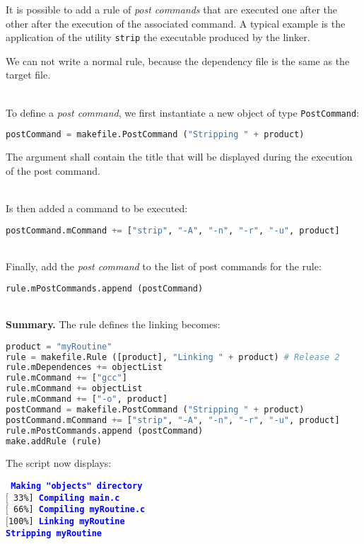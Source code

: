\documentclass[a4paper,11pt]{extarticle}
\begin{document}
It is possible to add a rule of \emph{post commands} that are executed one after the other after the execution of the associated command. A typical example is the application of the utility \texttt{strip} the executable produced by the linker.

We can not write a normal rule, because the dependency file is the same as the target file.

~\\To define a \emph{post command}, we first instantiate a new object of type \texttt{PostCommand}:
\begin{lstlisting}[language=py]
postCommand = makefile.PostCommand ("Stripping " + product)
\end{lstlisting}
The argument shall contain the title that will be displayed during the execution of the post command.

~\\Is then added a command to be executed:
\begin{lstlisting}[language=py]
postCommand.mCommand += ["strip", "-A", "-n", "-r", "-u", product]
\end{lstlisting}

~\\Finally, add the \emph{post command} to the list of post commands for the rule:
\begin{lstlisting}[language=py]
rule.mPostCommands.append (postCommand)
\end{lstlisting}


~\\{\bf Summary.} The rule defines the linking becomes:
\begin{lstlisting}[language=py]
product = "myRoutine"
rule = makefile.Rule ([product], "Linking " + product) # Release 2
rule.mDependences += objectList
rule.mCommand += ["gcc"]
rule.mCommand += objectList
rule.mCommand += ["-o", product]
postCommand = makefile.PostCommand ("Stripping " + product)
postCommand.mCommand += ["strip", "-A", "-n", "-r", "-u", product]
rule.mPostCommands.append (postCommand)
make.addRule (rule)
\end{lstlisting}

The script now displays:

\begin{mdframed}[hidealllines=true,backgroundcolor=lightgray!20]
\tt\footnotesize
\textcolor{blue}{\bf Making "objects" directory}\\
$[$~33\%]~\textcolor{blue}{\bf Compiling main.c}\\
$[$~66\%]~\textcolor{blue}{\bf Compiling myRoutine.c}\\
$[$100\%]~\textcolor{blue}{\bf Linking myRoutine}\\
\hspace*{4em}\textcolor{blue}{\bf Stripping myRoutine}
\end{mdframed}
\end{document}
